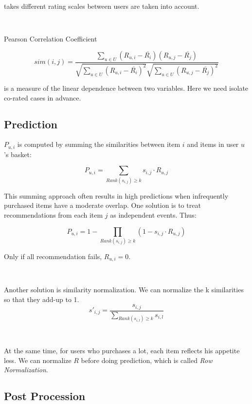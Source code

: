 \documentclass[11pt,a4paper,titlepage]{article}
\begin{document}
takes different rating scales between users are taken into account.

~

Pearson Correlation Coefficient\cite{sarwar2001item}

\begin{equation}
sim(i,j) = \frac{\sum_{u \in U}(R_{u,i} - \overline{R_i})(R_{u,j} - \overline{R_j})}{\sqrt{\sum_{u \in U}(R_{u,i} - \overline{R_i})^2}\sqrt{\sum_{u \in U}(R_{u,j} - \overline{R_j})^2}}
\end{equation}

is a measure of the linear dependence between two variables. Here we need isolate co-rated cases in advance.


\subsection{Prediction}

$P_{u,i}$ is computed by summing the similarities between item $i$ and items in user $u$'s basket:

\begin{equation}
P_{u,i} = \sum_{Rank(s_{i,j})\geq k} s_{i,j} \cdot R_{u,j}
\end{equation}

This summing approach often results in high predictions when infrequently purchased items have a moderate overlap. One solution is to treat recommendations from each item $j$ as independent events.  Thus:

\begin{equation}
P_{u,i} = 1 - \prod_{Rank(s_{i,j})\geq k} (1 - s_{i,j} \cdot R_{u,j})
\end{equation}

Only if all recommendation fails, $R_{u,i} = 0$.

~

Another solution is similarity normalization. We can normalize the k similarities so that they add-up to 1.
\begin{equation}
s'_{i,j} = \frac{s_{i,j} }{ \sum_{Rank(s_{i,l})\geq k} s_{i,l} }
\end{equation}

~

At the same time, for users who purchases a lot, each item reflects his appetite less. We can normalize $R$ before doing prediction, which is called \emph{Row Normalization}.


\subsection{Post Procession}
\end{document}
